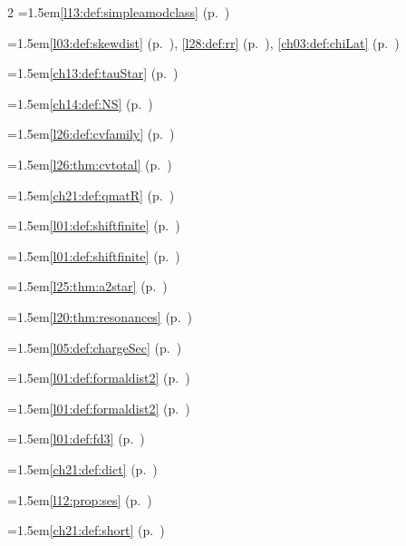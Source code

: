 \begin{multicols}{2}
\hangindent=1.5em\quad \ref{l13:def:simpleamodclass} (p.~\pageref{l13:def:simpleamodclass})\par
\hangindent=1.5em\quad \ref{l03:def:skewdist} (p.~\pageref{l03:def:skewdist}), \ref{l28:def:rr} (p.~\pageref{l28:def:rr}), \ref{ch03:def:chiLat} (p.~\pageref{ch03:def:chiLat})\par
\hangindent=1.5em\quad \ref{ch13:def:tauStar} (p.~\pageref{ch13:def:tauStar})\par
\hangindent=1.5em\quad \ref{ch14:def:NS} (p.~\pageref{ch14:def:NS})\par
\hangindent=1.5em\quad \ref{l26:def:cvfamily} (p.~\pageref{l26:def:cvfamily})\par
\hangindent=1.5em\quad \ref{l26:thm:cvtotal} (p.~\pageref{l26:thm:cvtotal})\par
\hangindent=1.5em\quad \ref{ch21:def:qmatR} (p.~\pageref{ch21:def:qmatR})\par
\hangindent=1.5em\quad \ref{l01:def:shiftfinite} (p.~\pageref{l01:def:shiftfinite})\par
\hangindent=1.5em\quad \ref{l01:def:shiftfinite} (p.~\pageref{l01:def:shiftfinite})\par
\hangindent=1.5em\quad \ref{l25:thm:a2star} (p.~\pageref{l25:thm:a2star})\par
\hangindent=1.5em\quad \ref{l20:thm:resonances} (p.~\pageref{l20:thm:resonances})\par
\hangindent=1.5em\quad \ref{l05:def:chargeSec} (p.~\pageref{l05:def:chargeSec})\par
\hangindent=1.5em\quad \ref{l01:def:formaldist2} (p.~\pageref{l01:def:formaldist2})\par
\hangindent=1.5em\quad \ref{l01:def:formaldist2} (p.~\pageref{l01:def:formaldist2})\par
\hangindent=1.5em\quad \ref{l01:def:fd3} (p.~\pageref{l01:def:fd3})\par
\hangindent=1.5em\quad \ref{ch21:def:dict} (p.~\pageref{ch21:def:dict})\par
\hangindent=1.5em\quad \ref{l12:prop:ses} (p.~\pageref{l12:prop:ses})\par
\hangindent=1.5em\quad \ref{ch21:def:short} (p.~\pageref{ch21:def:short})\par

\end{multicols}
